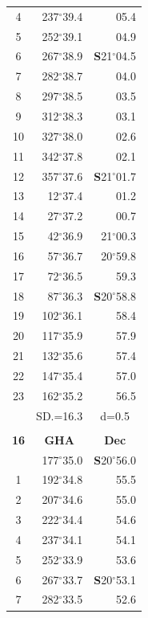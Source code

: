 \documentclass[10pt, a4paper]{report}
\begin{document}
\begin{scriptsize}
\begin{tabular*}{0.2\textwidth}[t]{@{\extracolsep{\fill}}|c|rr|}
4 & 237$^\circ$39.4 & 05.4\\
5 & 252$^\circ$39.1 & 04.9\\[2Pt]
6 & 267$^\circ$38.9 & \textbf{S}21$^\circ$04.5\\
7 & 282$^\circ$38.7 & 04.0\\
8 & 297$^\circ$38.5 & 03.5\\
9 & 312$^\circ$38.3 & \raisebox{0.24ex}{\boldmath$\cdot$~\boldmath$\cdot$~~}03.1\\
10 & 327$^\circ$38.0 & 02.6\\
11 & 342$^\circ$37.8 & 02.1\\[2Pt]
12 & 357$^\circ$37.6 & \textbf{S}21$^\circ$01.7\\
13 & 12$^\circ$37.4 & 01.2\\
14 & 27$^\circ$37.2 & 00.7\\
15 & 42$^\circ$36.9 & 21$^\circ$00.3\\
16 & 57$^\circ$36.7 & 20$^\circ$59.8\\
17 & 72$^\circ$36.5 & 59.3\\[2Pt]
18 & 87$^\circ$36.3 & \textbf{S}20$^\circ$58.8\\
19 & 102$^\circ$36.1 & 58.4\\
20 & 117$^\circ$35.9 & 57.9\\
21 & 132$^\circ$35.6 & \raisebox{0.24ex}{\boldmath$\cdot$~\boldmath$\cdot$~~}57.4\\
22 & 147$^\circ$35.4 & 57.0\\
23 & 162$^\circ$35.2 & 56.5\\
\hline
\rule{0pt}{2.4ex} & \multicolumn{1}{c}{SD.=16.3} & \multicolumn{1}{c|}{d=0.5}\\
\hline
\multicolumn{1}{c}{}\\[-0.5ex]\hline
\multicolumn{1}{|c|}{\rule{0pt}{2.6ex}\textbf{16}} & \multicolumn{1}{c}{\textbf{GHA}} & \multicolumn{1}{c|}{\textbf{Dec}}\\
\hline\rule{0pt}{2.6ex}\noindent
0 & 177$^\circ$35.0 & \textbf{S}20$^\circ$56.0\\
1 & 192$^\circ$34.8 & 55.5\\
2 & 207$^\circ$34.6 & 55.0\\
3 & 222$^\circ$34.4 & \raisebox{0.24ex}{\boldmath$\cdot$~\boldmath$\cdot$~~}54.6\\
4 & 237$^\circ$34.1 & 54.1\\
5 & 252$^\circ$33.9 & 53.6\\[2Pt]
6 & 267$^\circ$33.7 & \textbf{S}20$^\circ$53.1\\
7 & 282$^\circ$33.5 & 52.6\\

\end{tabular*}
\end{scriptsize}
\end{document}
